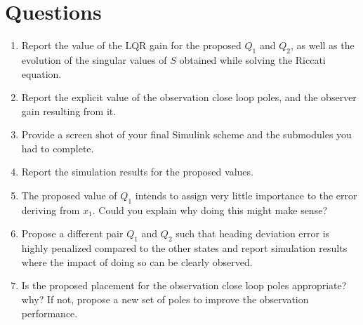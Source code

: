 \section{Questions}
	\begin{enumerate}
		\item Report the value of the LQR gain for the proposed $Q_1$ and $Q_2$, as well as the evolution of the singular values of $S$ obtained while solving the Riccati equation.
		\item Report the explicit value of the observation close loop poles, and the observer gain resulting from it. 
		\item Provide a screen shot of your final Simulink scheme and the submodules you had to complete. 
		\item Report the simulation results for the proposed values. 
		\item The proposed value of $Q_1$ intends to assign very little importance to the error deriving from $x_1$. Could you explain why doing this might make sense? 
		\item Propose a different pair $Q_1$ and $Q_2$ such that heading deviation error is highly penalized compared to the other states and report simulation results where the impact of doing so can be clearly observed. 
		\item Is the proposed placement for the observation close loop poles appropriate? why? If not, propose a new set of poles to improve the observation performance.
	\end{enumerate}